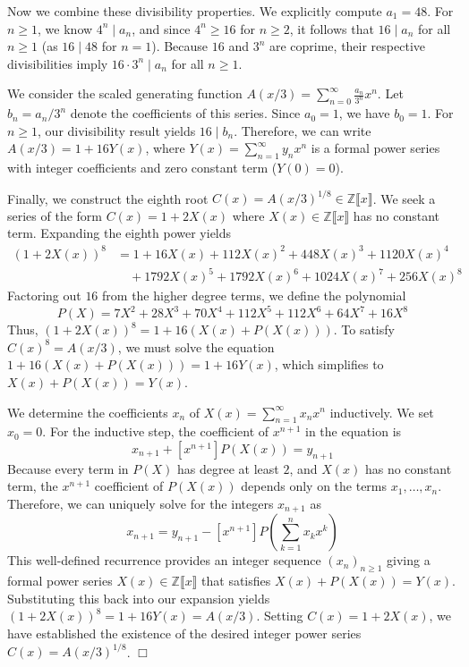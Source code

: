 Now we combine these divisibility properties. We explicitly compute $a_1 = 48$. For $n \ge 1$, we know $4^n \mid a_n$, and since $4^n \ge 16$ for $n \ge 2$, it follows that $16 \mid a_n$ for all $n \ge 1$ (as $16 \mid 48$ for $n=1$). Because $16$ and $3^n$ are coprime, their respective divisibilities imply $16 \cdot 3^n \mid a_n$ for all $n \ge 1$.

We consider the scaled generating function $A(x/3) = \sum_{n=0}^\infty \frac{a_n}{3^n} x^n$. Let $b_n = a_n / 3^n$ denote the coefficients of this series. Since $a_0 = 1$, we have $b_0 = 1$. For $n \ge 1$, our divisibility result yields $16 \mid b_n$. Therefore, we can write $A(x/3) = 1 + 16 Y(x)$, where $Y(x) = \sum_{n=1}^\infty y_n x^n$ is a formal power series with integer coefficients and zero constant term ($Y(0) = 0$).

Finally, we construct the eighth root $C(x) = A(x/3)^{1/8} \in \mathbb{Z}\llbracket x \rrbracket$. We seek a series of the form $C(x) = 1 + 2X(x)$ where $X(x) \in \mathbb{Z}\llbracket x \rrbracket$ has no constant term. Expanding the eighth power yields
$$ \begin{aligned} (1 + 2X(x))^8 &= 1 + 16X(x) + 112X(x)^2 + 448X(x)^3 + 1120X(x)^4 \\ &\quad + 1792X(x)^5 + 1792X(x)^6 + 1024X(x)^7 + 256X(x)^8 \end{aligned} $$
Factoring out $16$ from the higher degree terms, we define the polynomial
$$ P(X) = 7X^2 + 28X^3 + 70X^4 + 112X^5 + 112X^6 + 64X^7 + 16X^8 $$
Thus, $(1 + 2X(x))^8 = 1 + 16(X(x) + P(X(x)))$. To satisfy $C(x)^8 = A(x/3)$, we must solve the equation $1 + 16(X(x) + P(X(x))) = 1 + 16Y(x)$, which simplifies to $X(x) + P(X(x)) = Y(x)$. 

We determine the coefficients $x_n$ of $X(x) = \sum_{n=1}^\infty x_n x^n$ inductively. We set $x_0 = 0$. For the inductive step, the coefficient of $x^{n+1}$ in the equation is
$$ x_{n+1} + [x^{n+1}] P(X(x)) = y_{n+1} $$
Because every term in $P(X)$ has degree at least $2$, and $X(x)$ has no constant term, the $x^{n+1}$ coefficient of $P(X(x))$ depends only on the terms $x_1, \dots, x_n$. Therefore, we can uniquely solve for the integers $x_{n+1}$ as
$$ x_{n+1} = y_{n+1} - [x^{n+1}] P\left( \sum_{k=1}^n x_k x^k \right) $$
This well-defined recurrence provides an integer sequence $(x_n)_{n \ge 1}$ giving a formal power series $X(x) \in \mathbb{Z}\llbracket x \rrbracket$ that satisfies $X(x) + P(X(x)) = Y(x)$. Substituting this back into our expansion yields $(1 + 2X(x))^8 = 1 + 16Y(x) = A(x/3)$. Setting $C(x) = 1 + 2X(x)$, we have established the existence of the desired integer power series $C(x) = A(x/3)^{1/8}$. \hfill $\Box$